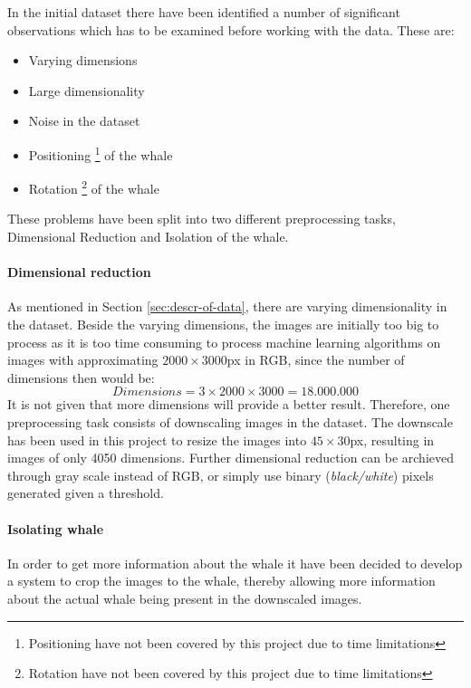 In the initial dataset there have been identified a number of significant observations which has to be examined before working with the data.
These are:
\begin{itemize}
\item Varying dimensions
\item Large dimensionality
\item Noise in the dataset
\item Positioning \footnote{Positioning have not been covered by this project due to time limitations} of the whale
\item Rotation \footnote{Rotation have not been covered by this project due to time limitations} of the whale
\end{itemize}
These problems have been split into two different preprocessing tasks, Dimensional Reduction and Isolation of the whale.

\paragraph{Dimensional reduction}

As mentioned in Section \ref{sec:descr-of-data}, there are varying dimensionality in the dataset. Beside the varying dimensions, the images are initially too big to process as it is too time consuming to process machine learning algorithms on images with approximating \( 2000 \times 3000\)px in RGB, since the number of dimensions then would be:
\begin{equation}
Dimensions = 3 \times 2000 \times 3000 = 18.000.000
\end{equation} 
It is not given that more dimensions will provide a better result.
Therefore, one preprocessing task consists of downscaling images in the dataset.
The downscale has been used in this project to resize the images into \(45 \times 30\)px, resulting in images of only 4050 dimensions.
Further dimensional reduction can be archieved through gray scale instead of RGB, or simply use binary (\emph{black/white}) pixels generated given a threshold.

\paragraph{Isolating whale}

In order to get more information about the whale it have been decided to develop a system to crop the images to the whale, thereby allowing more information about the actual whale being present in the downscaled images.

